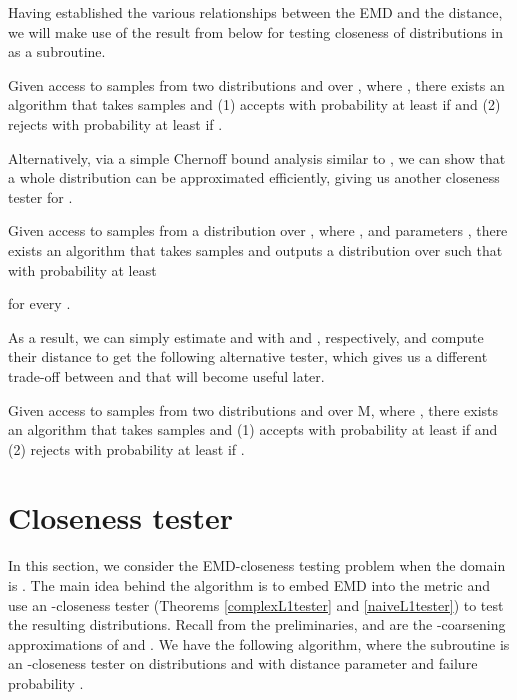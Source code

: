\documentclass[11pt]{article}
\newcommand{\mnote}[1]{}
\begin{document}
Having established the various relationships between the EMD and the  distance,
we will make use of the result from \cite{L1tester} below for testing closeness of distributions
in  as a subroutine.

\begin{theorem}\label{complexL1tester}
  Given access to samples from two distributions  and  over , where ,
  there exists an algorithm that takes 
  samples and (1) accepts with probability at least  if 
  and (2) rejects with probability at least  if .
\end{theorem}

Alternatively, via a simple Chernoff bound analysis similar to \cite{L1indep},
we can show that a whole distribution can be approximated efficiently, giving
us another closeness tester for .

\begin{lemma}Given access to samples from a distribution  over , where , and
  parameters , there exists an algorithm
  that takes  samples and outputs a
  distribution  over  such that with probability at least 
  
  for every .
\end{lemma}

As a result, we can simply estimate  and  with  and ,
respectively, and compute their  distance to get the following alternative
tester, which gives us a different trade-off between  and  that will
become useful later.

\begin{theorem}\label{naiveL1tester}\mnote{combine w Th. \ref{complexL1tester}?}
  Given access to samples from two distributions  and  over M, where ,
  there exists an algorithm that takes 
  samples and (1) accepts with probability at least  if 
  and (2) rejects with probability at least  if .
\end{theorem}

\section{Closeness tester}\label{section:41}

In this section, we consider the EMD-closeness testing problem when the
domain is . The main idea behind the algorithm is to
embed EMD into the  metric and use an -closeness tester (Theorems
\ref{complexL1tester} and \ref{naiveL1tester}) to test the
resulting distributions. Recall from the preliminaries,  and  are
the -coarsening approximations of  and . We have the following algorithm,
where the subroutine  is an
-closeness tester on distributions  and  with distance parameter 
and failure probability .
\end{document}
